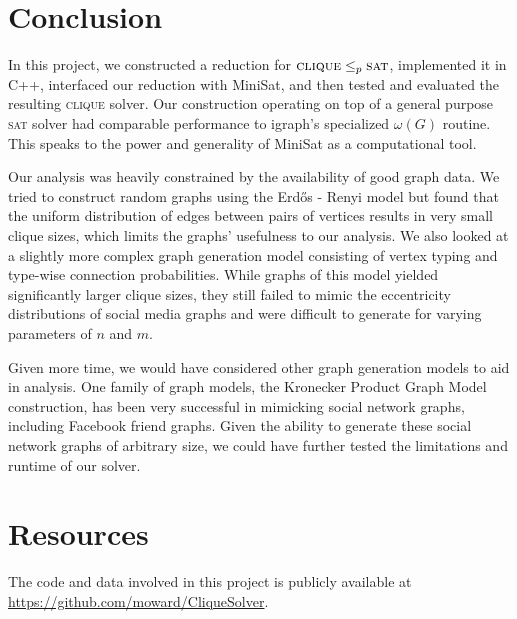\documentclass[]{article}
\newcommand{\clique}{\textsc{clique}}
\newcommand{\sat}{\textsc{sat}}
\begin{document}
	\section{Conclusion}
	In this project, we constructed a reduction for $\clique \le_p \sat$, implemented it in C++, interfaced our reduction with MiniSat, and then tested and evaluated the resulting \clique{} solver. Our construction operating on top of a general purpose \sat{} solver had comparable performance to igraph's specialized $\omega(G)$ routine. This speaks to the power and generality of MiniSat as a computational tool.
	
	Our analysis was heavily constrained by the availability of good graph data. We tried to construct random graphs using the Erdős - Renyi model but found that the uniform distribution of edges between pairs of vertices results in very small clique sizes, which limits the graphs' usefulness to our analysis. We also looked at a slightly more complex graph generation model consisting of vertex typing and type-wise connection probabilities. While graphs of this model yielded significantly larger clique sizes, they still failed to mimic the eccentricity distributions of social media graphs and were difficult to generate for varying parameters of $n$ and $m$.
	
	Given more time, we would have considered other graph generation models to aid in analysis. One family of graph models, the Kronecker Product Graph Model construction, has been very successful in mimicking social network graphs\cite{Leskovec:2010:KGA:1756006.1756039}, including Facebook friend graphs\cite{moreno2013block}. Given the ability to generate these social network graphs of arbitrary size, we could have further tested the limitations and runtime of our solver.
	\section{Resources}
	The code and data involved in this project is publicly available at \url{https://github.com/moward/CliqueSolver}.
	
	\newpage
	\printbibliography
\end{document}
